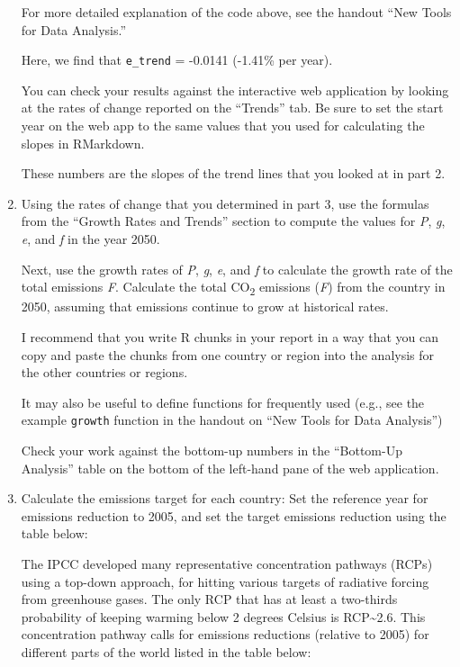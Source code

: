 \documentclass[
]{article}
\begin{document}
\begin{enumerate}
  For more detailed explanation of the code above, see the handout ``New
  Tools for Data Analysis.''

  Here, we find that \texttt{e\_trend} = -0.0141 (-1.41\% per year).

  You can check your results against the interactive web application by
  looking at the rates of change reported on the ``Trends'' tab. Be sure
  to set the start year on the web app to the same values that you used
  for calculating the slopes in RMarkdown.

  These numbers are the slopes of the trend lines that you looked at in
  part 2.
\item
  Using the rates of change that you determined in part 3, use the
  formulas from the ``Growth Rates and Trends'' section to compute the
  values for \emph{P}, \emph{g}, \emph{e}, and \emph{f} in the year
  2050.

  Next, use the growth rates of \emph{P}, \emph{g}, \emph{e}, and
  \emph{f} to calculate the growth rate of the total emissions \emph{F}.
  Calculate the total CO\textsubscript{2} emissions (\emph{F}) from the
  country in 2050, assuming that emissions continue to grow at
  historical rates.

  I recommend that you write R chunks in your report in a way that you
  can copy and paste the chunks from one country or region into the
  analysis for the other countries or regions.

  It may also be useful to define functions for frequently used (e.g.,
  see the example \texttt{growth} function in the handout on ``New Tools
  for Data Analysis'')

  Check your work against the bottom-up numbers in the ``Bottom-Up
  Analysis'' table on the bottom of the left-hand pane of the web
  application.
\item
  Calculate the emissions target for each country: Set the reference
  year for emissions reduction to 2005, and set the target emissions
  reduction using the table below:

  The IPCC developed many representative concentration pathways (RCPs)
  using a top-down approach, for hitting various targets of radiative
  forcing from greenhouse gases. The only RCP that has at least a
  two-thirds probability of keeping warming below 2 degrees Celsius is
  RCP\textasciitilde2.6. This concentration pathway calls for emissions
  reductions (relative to 2005) for different parts of the world listed
  in the table below:


\end{enumerate}
\end{document}
